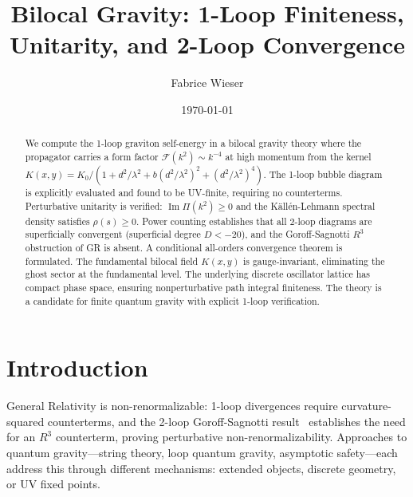 \documentclass[aps,prd,reprint,nofootinbib]{revtex4-2}
\begin{document}
\title{Bilocal Gravity: 1-Loop Finiteness, Unitarity, and 2-Loop Convergence}

\author{Fabrice Wieser}

\date{\today}

\begin{abstract}
We compute the 1-loop graviton self-energy in a bilocal gravity theory where the propagator carries a form factor $\mathcal{F}(k^2) \sim k^{-4}$ at high momentum from the kernel $K(x,y) = K_0/(1+d^2/\lambda^2+b(d^2/\lambda^2)^2+(d^2/\lambda^2)^4)$. The 1-loop bubble diagram is explicitly evaluated and found to be UV-finite, requiring no counterterms. Perturbative unitarity is verified: $\operatorname{Im}\Pi(k^2)\geq 0$ and the K\"all\'en-Lehmann spectral density satisfies $\rho(s)\geq 0$. Power counting establishes that all 2-loop diagrams are superficially convergent (superficial degree $D<-20$), and the Goroff-Sagnotti $R^3$ obstruction of GR is absent. A conditional all-orders convergence theorem is formulated. The fundamental bilocal field $K(x,y)$ is gauge-invariant, eliminating the ghost sector at the fundamental level. The underlying discrete oscillator lattice has compact phase space, ensuring nonperturbative path integral finiteness. The theory is a candidate for finite quantum gravity with explicit 1-loop verification.
\end{abstract}

\maketitle


\section{Introduction}
\label{sec:intro}

General Relativity is non-renormalizable: 1-loop divergences require curvature-squared counterterms, and the 2-loop Goroff-Sagnotti result~\cite{GoroffSagnotti1986} establishes the need for an $R^3$ counterterm, proving perturbative non-renormalizability. Approaches to quantum gravity---string theory, loop quantum gravity, asymptotic safety---each address this through different mechanisms: extended objects, discrete geometry, or UV fixed points.
\end{document}
